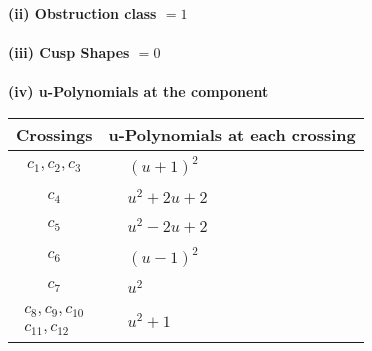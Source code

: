 \documentclass[1p]{elsarticle_modified}
\theoremstyle{definition}
\begin{document}
\flushleft \textbf{(ii) Obstruction class $= 1$}\\~\\
\flushleft \textbf{(iii) Cusp Shapes $= 0$}\\~\\
\newpage\renewcommand{\arraystretch}{1}
\flushleft \textbf{(iv) u-Polynomials at the component}\newline \\
\begin{tabular}{m{50pt}|m{274pt}}
Crossings & \hspace{64pt}u-Polynomials at each crossing \\
\hline $$\begin{aligned}c_{1},c_{2},c_{3}\end{aligned}$$&$\begin{aligned}
&(u+1)^2
\end{aligned}$\\
\hline $$\begin{aligned}c_{4}\end{aligned}$$&$\begin{aligned}
&u^2+2 u+2
\end{aligned}$\\
\hline $$\begin{aligned}c_{5}\end{aligned}$$&$\begin{aligned}
&u^2-2 u+2
\end{aligned}$\\
\hline $$\begin{aligned}c_{6}\end{aligned}$$&$\begin{aligned}
&(u-1)^2
\end{aligned}$\\
\hline $$\begin{aligned}c_{7}\end{aligned}$$&$\begin{aligned}
&u^2
\end{aligned}$\\
\hline $$\begin{aligned}c_{8},c_{9},c_{10}\\c_{11},c_{12}\end{aligned}$$&$\begin{aligned}
&u^2+1
\end{aligned}$\\
\hline
\end{tabular}\\~\\
\end{document}
